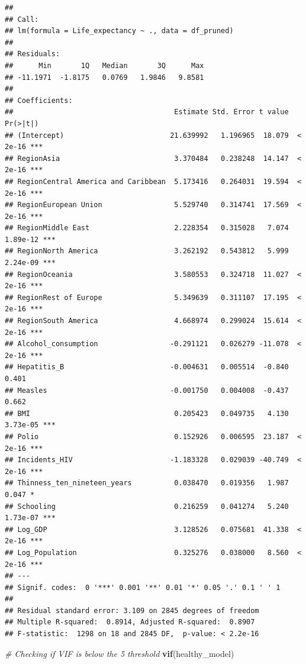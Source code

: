 \documentclass[
  10pt,
]{article}
\newenvironment{Shaded}{\begin{snugshade}}{\end{snugshade}}
\newcommand{\CommentTok}[1]{\textcolor[rgb]{0.56,0.35,0.01}{\textit{#1}}}
\newcommand{\FunctionTok}[1]{\textcolor[rgb]{0.13,0.29,0.53}{\textbf{#1}}}
\newcommand{\NormalTok}[1]{#1}
\begin{document}
\begin{verbatim}
## 
## Call:
## lm(formula = Life_expectancy ~ ., data = df_pruned)
## 
## Residuals:
##      Min       1Q   Median       3Q      Max 
## -11.1971  -1.8175   0.0769   1.9846   9.8581 
## 
## Coefficients:
##                                      Estimate Std. Error t value Pr(>|t|)    
## (Intercept)                         21.639992   1.196965  18.079  < 2e-16 ***
## RegionAsia                           3.370484   0.238248  14.147  < 2e-16 ***
## RegionCentral America and Caribbean  5.173416   0.264031  19.594  < 2e-16 ***
## RegionEuropean Union                 5.529740   0.314741  17.569  < 2e-16 ***
## RegionMiddle East                    2.228354   0.315028   7.074 1.89e-12 ***
## RegionNorth America                  3.262192   0.543812   5.999 2.24e-09 ***
## RegionOceania                        3.580553   0.324718  11.027  < 2e-16 ***
## RegionRest of Europe                 5.349639   0.311107  17.195  < 2e-16 ***
## RegionSouth America                  4.668974   0.299024  15.614  < 2e-16 ***
## Alcohol_consumption                 -0.291121   0.026279 -11.078  < 2e-16 ***
## Hepatitis_B                         -0.004631   0.005514  -0.840    0.401    
## Measles                             -0.001750   0.004008  -0.437    0.662    
## BMI                                  0.205423   0.049735   4.130 3.73e-05 ***
## Polio                                0.152926   0.006595  23.187  < 2e-16 ***
## Incidents_HIV                       -1.183328   0.029039 -40.749  < 2e-16 ***
## Thinness_ten_nineteen_years          0.038470   0.019356   1.987    0.047 *  
## Schooling                            0.216259   0.041274   5.240 1.73e-07 ***
## Log_GDP                              3.128526   0.075681  41.338  < 2e-16 ***
## Log_Population                       0.325276   0.038000   8.560  < 2e-16 ***
## ---
## Signif. codes:  0 '***' 0.001 '**' 0.01 '*' 0.05 '.' 0.1 ' ' 1
## 
## Residual standard error: 3.109 on 2845 degrees of freedom
## Multiple R-squared:  0.8914, Adjusted R-squared:  0.8907 
## F-statistic:  1298 on 18 and 2845 DF,  p-value: < 2.2e-16
\end{verbatim}

\begin{Shaded}
\begin{Highlighting}[]
\CommentTok{\# Checking if VIF is below the 5 threshold}
\FunctionTok{vif}\NormalTok{(healthy\_model)}
\end{Highlighting}
\end{Shaded}
\end{document}
